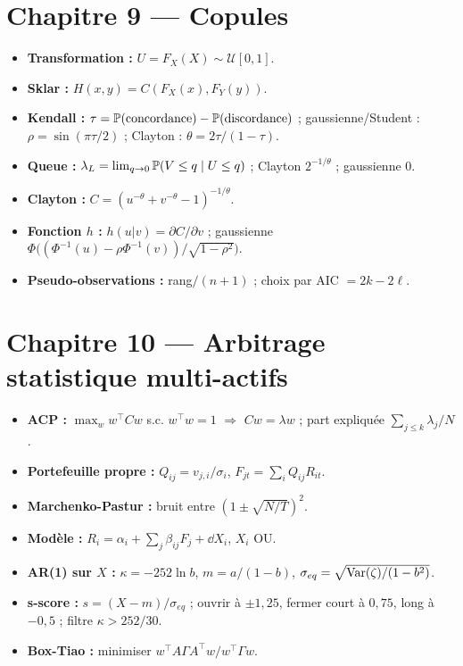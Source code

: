 \section*{Chapitre 9 — Copules}
\begin{itemize}[leftmargin=1.2em,itemsep=0.05em]
\item \textbf{Transformation :} $U = F_X(X)\sim\mathcal U[0,1]$.
\item \textbf{Sklar :} $H(x,y) = C(F_X(x),F_Y(y))$.
\item \textbf{Kendall :} $\tau = \mathbb{P}(\text{concordance}) - \mathbb{P}(\text{discordance})$ ; gaussienne/Student : $\rho = \sin(\pi\tau/2)$ ; Clayton : $\theta = 2\tau/(1-\tau)$.
\item \textbf{Queue :} $\lambda_L = \lim_{q\to0}\mathbb{P}(V\le q\mid U\le q)$ ; Clayton $2^{-1/\theta}$ ; gaussienne 0.
\item \textbf{Clayton :} $C = (u^{-\theta}+v^{-\theta}-1)^{-1/\theta}$.
\item \textbf{Fonction $h$ :} $h(u|v) = \partial C/\partial v$ ; gaussienne $\Phi\big((\Phi^{-1}(u)-\rho\Phi^{-1}(v))/\sqrt{1-\rho^2}\big)$.
\item \textbf{Pseudo-observations :} rang$/(n+1)$ ; choix par AIC $= 2k-2\ell$.
\end{itemize}

\section*{Chapitre 10 — Arbitrage statistique multi-actifs}
\begin{itemize}[leftmargin=1.2em,itemsep=0.05em]
\item \textbf{ACP :} $\max_w w^\top Cw$ s.c. $w^\top w=1$ $\Rightarrow$ $Cw = \lambda w$ ; part expliquée $\sum_{j\le k}\lambda_j/N$.
\item \textbf{Portefeuille propre :} $Q_{ij} = v_{j,i}/\sigma_i$, $F_{jt} = \sum_iQ_{ij}R_{it}$.
\item \textbf{Marchenko-Pastur :} bruit entre $(1\pm\sqrt{N/T})^2$.
\item \textbf{Modèle :} $R_i = \alpha_i + \sum_j\beta_{ij}F_j + \dd X_i$, $X_i$ OU.
\item \textbf{AR(1) sur $X$ :} $\kappa = -252\ln b$, $m = a/(1-b)$, $\sigma_{eq} = \sqrt{\operatorname{Var}(\zeta)/(1-b^2)}$.
\item \textbf{s-score :} $s = (X - m)/\sigma_{eq}$ ; ouvrir à $\pm1{,}25$, fermer court à $0{,}75$, long à $-0{,}5$ ; filtre $\kappa > 252/30$.
\item \textbf{Box-Tiao :} minimiser $w^\top A\Gamma A^\top w/w^\top\Gamma w$.
\end{itemize}

